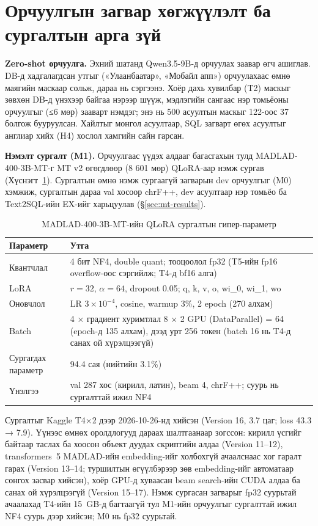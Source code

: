 \section{Орчуулгын загвар хөгжүүлэлт ба сургалтын арга зүй}
\label{sec:mt-train}

\textbf{Zero-shot орчуулга.} Эхний шатанд Qwen3.5-9B-д орчуулах заавар өгч ашиглав. DB-д хадгалагдсан утгыг
(«Улаанбаатар», «Мобайл апп») орчуулахаас өмнө \tsql{[V1]} маягийн маскаар сольж, дараа нь сэргээнэ. Хоёр дахь хувилбар
(T2) маскыг зөвхөн DB-д үнэхээр байгаа нэрээр шүүж, мэдлэгийн сангаас нэр томьёоны орчуулгыг (≤6 мөр) зааварт нэмдэг;
энэ нь 500 асуултын маскыг 122-оос 37 болгож бууруулсан. Хайлтыг монгол асуултаар, SQL загварт өгөх асуултыг англиар
хийх (H4) хослол хамгийн сайн гарсан.

\textbf{Нэмэлт сургалт (M1).} Орчуулгаас үүдэх алдааг багасгахын тулд MADLAD-400-3B-MT-г MT v2 өгөгдлөөр (8 601 мөр)
QLoRA-аар нэмж сургав (Хүснэгт~\ref{tab:mt-hparams}). Сургалтын өмнө нэмж сургаагүй загварын dev орчуулгыг (M0)
хэмжиж, сургалтын дараа val хосоор chrF++, dev асуултаар нэр томьёо ба Text2SQL-ийн EX-ийг харьцуулав (§\ref{sec:mt-results}).

\begin{table}[H]
\centering\small
\caption{MADLAD-400-3B-MT-ийн QLoRA сургалтын гипер-параметр}
\label{tab:mt-hparams}
\begin{tabularx}{\textwidth}{p{4.6cm}X}
\toprule
Параметр & Утга \\
\midrule
Квантчлал & 4 бит NF4, double quant; тооцоолол fp32 (T5-ийн fp16 overflow-оос сэргийлж; T4-д bf16 алга) \\
LoRA & $r = 32$, $\alpha = 64$, dropout 0.05; q, k, v, o, wi\_0, wi\_1, wo \\
Оновчлол & LR $3\times10^{-4}$, cosine, warmup 3\%, 2 epoch (270 алхам) \\
Batch & 4 × градиент хуримтлал 8 × 2 GPU (DataParallel) = 64 (epoch-д 135 алхам), дээд урт 256 токен (batch 16 нь T4-д санах ой хүрэлцээгүй) \\
Сургагдах параметр & 94.4 сая (нийтийн 3.1\%) \\
Үнэлгээ & val 287 хос (кирилл, латин), beam 4, chrF++; суурь нь сургалттай ижил NF4 \\
\bottomrule
\end{tabularx}
\end{table}

Сургалтыг Kaggle T4×2 дээр 2026-10-26-нд хийсэн (Version 16, 3.7 цаг; loss 43.3 → 7.9). Үүнээс өмнөх оролдлогууд дараах
шалтгаанаар зогссон: кирилл үсгийг байтаар таслах ба хоосон объект дуудах скриптийн алдаа (Version 11--12), transformers~5
MADLAD-ийн embedding-ийг холбохгүй ачаалснаас хог гаралт гарах (Version 13--14; туршилтын өгүүлбэрээр зөв embedding-ийг
автоматаар сонгох засвар хийсэн), хоёр GPU-д хуваасан beam search-ийн CUDA алдаа ба санах ой хүрэлцээгүй (Version 15--17).
Нэмж сургасан загварыг fp32 суурьтай ачаалахад T4-ийн 15~GB-д багтаагүй тул M1-ийн орчуулгыг сургалттай ижил NF4 суурь дээр
хийсэн; M0 нь fp32 суурьтай.

